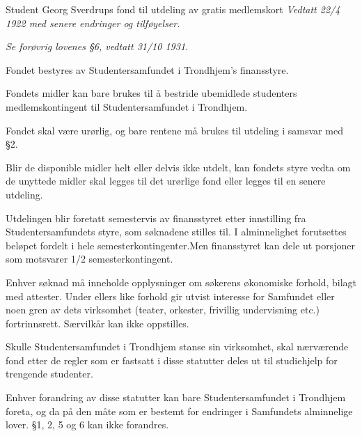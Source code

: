 \begin{fond}{Student Georg Sverdrups fond til utdeling av gratis medlemskort}
    \emph{Vedtatt 22/4 1922 med senere endringer og tilføyelser.}

    \emph{Se forøvrig lovenes §6, vedtatt 31/10 1931.}

  \begin{fondsparagraf}{}
  Fondet bestyres av Studentersamfundet i Trondhjem's finansstyre.
  \end{fondsparagraf}
  
  \begin{fondsparagraf}{}
Fondets midler kan bare brukes til å bestride ubemidlede studenters medlemskontingent til Studentersamfundet i
Trondhjem.
  \end{fondsparagraf}
  
  \begin{fondsparagraf}{}
Fondet skal være urørlig, og bare rentene må brukes til utdeling i samsvar med §2.

Blir de disponible midler helt eller delvis ikke utdelt, kan fondets styre vedta om de unyttede midler skal legges til det
urørlige fond eller legges til en senere utdeling.
  \end{fondsparagraf}

  \begin{fondsparagraf}{}
Utdelingen blir foretatt semestervis av finansstyret etter innstilling fra Studentersamfundets styre, som søknadene
stilles til. I alminnelighet forutsettes beløpet fordelt i hele semesterkontingenter.Men finansstyret kan dele ut porsjoner
som motsvarer 1/2 semesterkontingent.
  \end{fondsparagraf}
  
  \begin{fondsparagraf}{}
Enhver søknad må inneholde opplysninger om søkerens økonomiske forhold, bilagt med attester. Under ellers like
forhold gir utvist interesse for Samfundet eller noen gren av dets virksomhet (teater, orkester, frivillig undervisning
etc.) fortrinnsrett. Særvilkår kan ikke oppstilles.
  \end{fondsparagraf}
  
  \begin{fondsparagraf}{}
Skulle Studentersamfundet i Trondhjem stanse sin virksomhet, skal nærværende fond etter de regler som er fastsatt i
disse statutter deles ut til studiehjelp for trengende studenter.
  \end{fondsparagraf}
  
  \begin{fondsparagraf}{}
Enhver forandring av disse statutter kan bare Studentersamfundet i Trondhjem foreta, og da på den måte som er
bestemt for endringer i Samfundets alminnelige lover. §1, 2, 5 og 6 kan ikke forandres.
  \end{fondsparagraf}
  
\end{fond}



